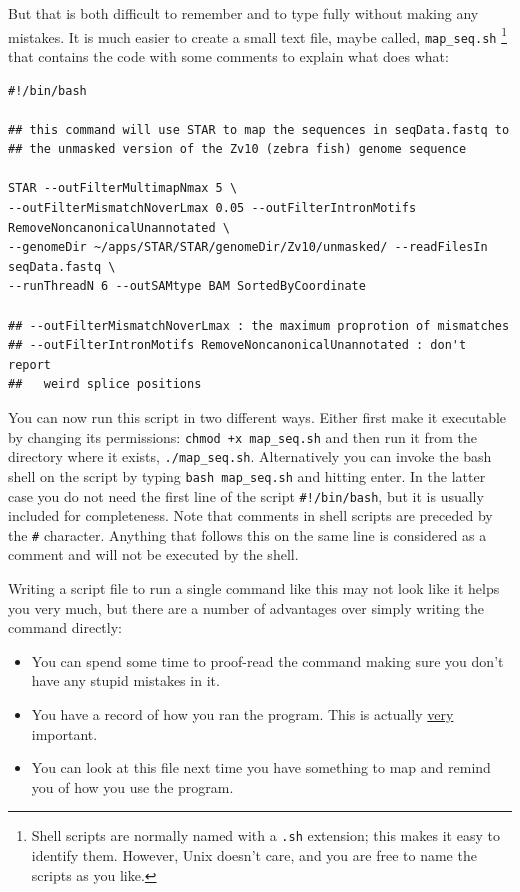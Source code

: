 \documentclass[11pt]{article}
\begin{document}
But that is both difficult to remember and to type fully without making any
mistakes. It is much easier to create a small text file, maybe called,
\texttt{map\_seq.sh} \footnote{Shell scripts are normally named with a \texttt{.sh} extension; this makes it
easy to identify them. However, Unix doesn't care, and you are free to name
the scripts as you like.
 } that contains the code with some comments to
explain what does what:


\begin{verbatim}
#!/bin/bash

## this command will use STAR to map the sequences in seqData.fastq to
## the unmasked version of the Zv10 (zebra fish) genome sequence

STAR --outFilterMultimapNmax 5 \
--outFilterMismatchNoverLmax 0.05 --outFilterIntronMotifs RemoveNoncanonicalUnannotated \
--genomeDir ~/apps/STAR/STAR/genomeDir/Zv10/unmasked/ --readFilesIn seqData.fastq \
--runThreadN 6 --outSAMtype BAM SortedByCoordinate

## --outFilterMismatchNoverLmax : the maximum proprotion of mismatches
## --outFilterIntronMotifs RemoveNoncanonicalUnannotated : don't report 
##   weird splice positions
\end{verbatim}

You can now run this script in two different ways. Either first make it
executable by changing its permissions: \texttt{chmod +x map\_seq.sh} and then run it
from the directory where it exists, \texttt{./map\_seq.sh}. Alternatively you can
invoke the bash shell on the script by typing \texttt{bash map\_seq.sh} and hitting
enter. In the latter case you do not need the first line of the script
\texttt{\#!/bin/bash}, but it is usually included for completeness. Note that comments
in shell scripts are preceded by the \texttt{\#} character. Anything that follows
this on the same line is considered as a comment and will not be executed by
the shell.

Writing a script file to run a single command like this may not look like it
helps you very much, but there are a number of advantages over simply writing
the command directly:
\begin{itemize}
\item You can spend some time to proof-read the command making sure you don't
  have any stupid mistakes in it.
\item You have a record of how you ran the program. This is actually \underline{very}
  important.
\item You can look at this file next time you have something to map and remind
  you of how you use the program.
\end{itemize}
\end{document}
